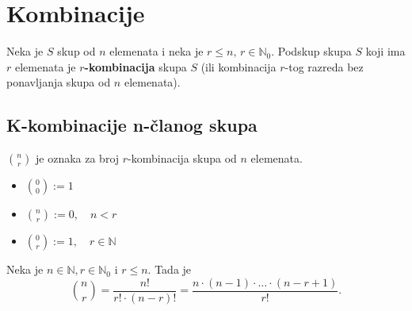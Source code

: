 \section{Kombinacije}

Neka je $S$ skup od $n$ elemenata i neka je $r\leq n,\,r\in\mathbb{N}_0$.
Podskup skupa $S$ koji ima $r$ elemenata je \textbf{$r$-kombinacija} skupa $S$
(ili kombinacija $r$-tog razreda bez ponavljanja skupa od $n$ elemenata).

\subsection{K-kombinacije n-članog skupa}

$\binom{n}{r}$ je oznaka za broj $r$-kombinacija skupa od $n$ elemenata.

\begin{itemize}
    \item $\binom{0}{0} := 1$
    \item $\binom{n}{r} := 0,\quad n < r$
    \item $\binom{0}{r} := 1,\quad r \in \mathbb{N}$
\end{itemize}

\begin{theorem}
    Neka je $n \in \mathbb{N}, r \in \mathbb{N}_0$ i $r\leq n$. Tada je
    $$
    \binom{n}{r} = \frac{n!}{r!\cdot (n-r)!} = \frac{n\cdot (n-1)\cdot \dots \cdot (n-r+1)}{r!}.
    $$
\end{theorem}
